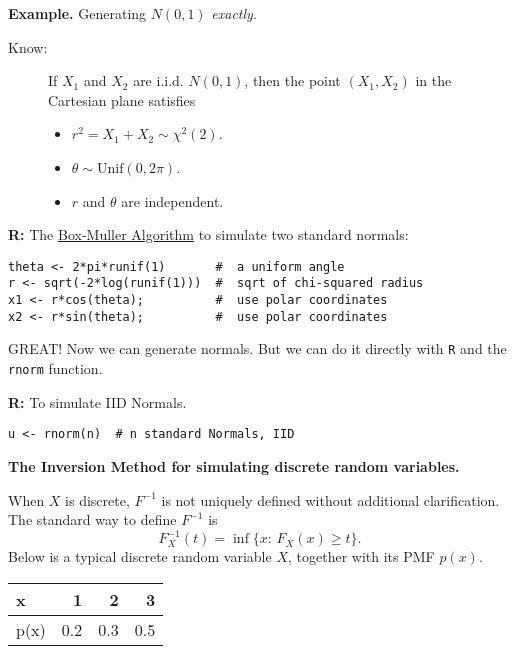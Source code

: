 \documentclass[captions=tableheading]{scrbook}
\begin{document}
\begin{itemize}
\textbf{Example.} Generating \(N(0,1)\) \emph{exactly}.


\begin{description}
\item[Know:] If $X_{1}$ and $X_{2}$ are i.i.d. $N(0,1)$, then the point $(X_{1},X_{2})$ in the Cartesian plane satisfies
\begin{itemize}
\item $r^{2}=X_{1}+X_{2}\sim\chi^{2}(2)$.
\item $\theta \sim \mathrm{Unif}(0,2\pi)$.
\item $r$ and $\theta$ are independent.
\end{itemize}
\end{description}

\textbf{R:} The \underline{Box-Muller Algorithm} to simulate two standard normals:

\begin{verbatim}
theta <- 2*pi*runif(1)       #  a uniform angle
r <- sqrt(-2*log(runif(1)))  #  sqrt of chi-squared radius
x1 <- r*cos(theta);          #  use polar coordinates
x2 <- r*sin(theta);          #  use polar coordinates
\end{verbatim}

GREAT! Now we can generate normals. But we can do it directly with \texttt{R} and the \texttt{rnorm} function.

\textbf{R:} To simulate IID Normals.

\begin{verbatim}
u <- rnorm(n)  # n standard Normals, IID
\end{verbatim}


\textbf{The Inversion Method for simulating discrete random variables.}  

When $X$ is discrete, $F^{-1}$ is not uniquely defined without additional clarification. The standard way to define $F^{-1}$ is 
\[
F_{X}^{-1}(t)=\inf\{x:\, F_{X}(x)\geq t\}.
\]
Below is a typical discrete random variable $X$, together with its PMF $p(x)$.


\begin{center}
\begin{tabular}{lrrr}
 x     &    1  &    2  &    3  \\
\hline
 p(x)  &  0.2  &  0.3  &  0.5  \\
\end{tabular}
\end{center}



\begin{center}


\end{center}
\end{itemize}
\end{document}
